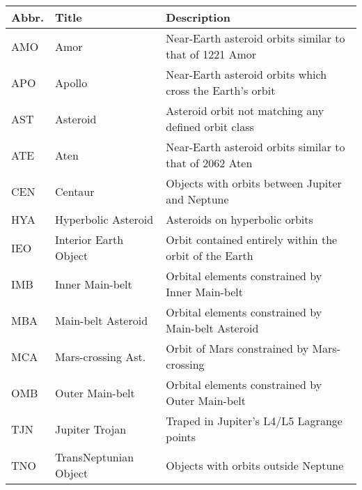 \begin{tabular}{m{}m{}m{}}\toprule					
\textbf{Abbr.}	&	\textbf{Title}	&	\textbf{Description}	\\
\midrule[0.1pt]\vspace{-10pt}					
AMO	&	Amor	&	Near-Earth asteroid orbits similar to that of 1221 Amor	\\
APO	&	Apollo	&	Near-Earth asteroid orbits which cross the Earth's orbit	\\
AST	&	Asteroid	&	Asteroid orbit not matching any defined orbit class	\\
ATE	&	Aten	&	Near-Earth asteroid orbits similar to that of 2062 Aten	\\
CEN	&	Centaur	&	Objects with orbits between Jupiter and Neptune	\\
HYA	&	Hyperbolic Asteroid	&	Asteroids on hyperbolic orbits	\\
IEO	&	Interior Earth Object	&	Orbit contained entirely within the orbit of the Earth	\\
IMB	&	Inner Main-belt	&	Orbital elements constrained by Inner Main-belt	\\
MBA	&	Main-belt Asteroid	&	Orbital elements constrained by Main-belt Asteroid	\\
MCA	&	Mars-crossing Ast.	&	Orbit of Mars constrained by Mars-crossing	\\
OMB	&	Outer Main-belt	&	Orbital elements constrained by Outer Main-belt	\\
TJN	&	Jupiter Trojan	&	Traped in Jupiter's L4/L5 Lagrange points	\\
TNO	&	TransNeptunian Object	&	Objects with orbits outside Neptune	\\
\bottomrule\end{tabular}					